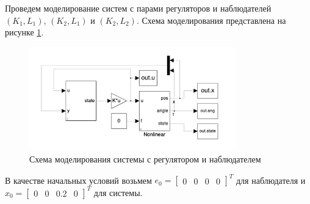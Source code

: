 Проведем моделирование систем с парами регуляторов и наблюдателей $(K_1, L_1)$, $(K_2, L_1)$ и $(K_2, L_2)$. Схема моделирования 
представлена на рисунке \ref{fig:KL_scheme}. 
\begin{figure}[ht!]
    \centering
    \includegraphics[width=0.8\textwidth]{media/KL_scheme.png}
    \caption{Схема моделирования системы с регулятором и наблюдателем}
    \label{fig:KL_scheme}   
\end{figure}
В качестве начальных условий возьмем $e_0 = \begin{bmatrix} 0 & 0 & 0 & 0 \end{bmatrix}^T$ для наблюдателя
и $x_0 = \begin{bmatrix} 0 & 0 & 0.2 & 0 \end{bmatrix}^T$ для системы. 

